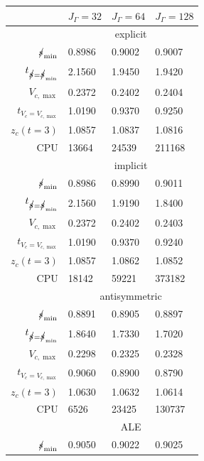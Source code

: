 \begin{table}
\center
\hspace*{-3.25cm}
\begin{tabular}{rlll}
\hline
 & $J_\Gamma=32$ & $J_\Gamma=64$ & $J_\Gamma=128$ \\
\hline
& \multicolumn{3}{c}{explicit} \\
\cmidrule{2-4}
$\mbox{$s\!\!\!\!\:/$}_{\min}$                & 0.8986 & 0.9002 & 0.9007 \\
$t_{\strikes = \strikes_{\min}}$ & 2.1560 & 1.9450 & 1.9420 \\
$V_{c,\max}$                     & 0.2372 & 0.2402 & 0.2404 \\
$t_{V_c = V_{c,\max}}$           & 1.0190 & 0.9370 & 0.9250 \\
$z_c(t=3)$                       & 1.0857 & 1.0837 & 1.0816 \\
CPU                              &  13664 &  24539 & 211168 \\
\cmidrule{2-4}
& \multicolumn{3}{c}{implicit} \\
\cmidrule{2-4}
$\mbox{$s\!\!\!\!\:/$}_{\min}$                & 0.8986 & 0.8990 & 0.9011 \\
$t_{\strikes = \strikes_{\min}}$ & 2.1560 & 1.9190 & 1.8400 \\
$V_{c,\max}$                     & 0.2372 & 0.2402 & 0.2403 \\
$t_{V_c = V_{c,\max}}$           & 1.0190 & 0.9370 & 0.9240 \\
$z_c(t=3)$                       & 1.0857 & 1.0862 & 1.0852 \\
CPU                              &  18142 &  59221 & 373182 \\
\cmidrule{2-4}
& \multicolumn{3}{c}{antisymmetric} \\
\cmidrule{2-4}
$\mbox{$s\!\!\!\!\:/$}_{\min}$                & 0.8891 & 0.8905 & 0.8897 \\
$t_{\strikes = \strikes_{\min}}$ & 1.8640 & 1.7330 & 1.7020 \\
$V_{c,\max}$                     & 0.2298 & 0.2325 & 0.2328 \\
$t_{V_c = V_{c,\max}}$           & 0.9060 & 0.8900 & 0.8790 \\
$z_c(t=3)$                       & 1.0630 & 1.0632 & 1.0614 \\
CPU                              &   6526 &  23425 & 130737 \\
\cmidrule{2-4}
& \multicolumn{3}{c}{ALE} \\
\cmidrule{2-4}
$\mbox{$s\!\!\!\!\:/$}_{\min}$                & 0.9050 & 0.9022 & 0.9025 \\

\end{tabular}
\end{table}
